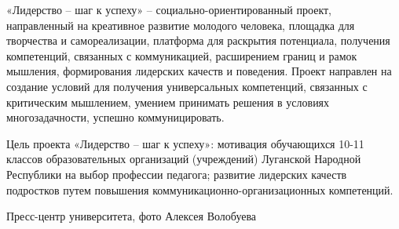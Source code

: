 «Лидерство – шаг к успеху» – социально-ориентированный проект, направленный на
креативное развитие молодого человека, площадка для творчества и
самореализации, платформа для раскрытия потенциала, получения компетенций,
связанных с коммуникацией, расширением границ и рамок мышления, формирования
лидерских качеств и поведения. Проект направлен на создание условий для
получения универсальных компетенций, связанных с критическим мышлением, умением
принимать решения в условиях многозадачности, успешно коммуницировать.


Цель проекта «Лидерство – шаг к успеху»: мотивация обучающихся 10-11 классов
образовательных организаций (учреждений) Луганской Народной Республики на выбор
профессии педагога; развитие лидерских качеств подростков путем повышения
коммуникационно-организационных компетенций.

Пресс-центр университета, фото Алексея Волобуева 


